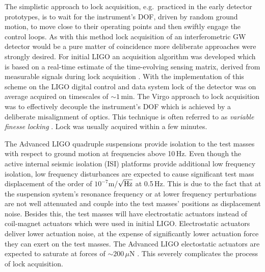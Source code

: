 The simplistic approach to lock acquisition, e.g.\ practiced in the early detector prototypes, is to wait for the instrument's DOF, driven by random ground motion, to move close to their operating points and then swiftly engage
the control loops. As with this method lock acquisition of an interferometric GW detector would be a pure matter of coincidence more deliberate approaches were strongly desired.
For initial LIGO an acquisition algorithm was developed which is based on a real-time estimate of the time-evolving sensing matrix, derived from measurable signals during lock acquisition \cite{EMFBBGKLSW02}.
With the implementation of this scheme on the LIGO digital control and data system lock of the detector was on average acquired on timescales of $\sim1$\,min. 
The Virgo approach to lock acquisition was to effectively decouple the instrument's DOF which is achieved by a deliberate misalignment of optics. This technique is often referred to as \emph{variable 
finesse locking} \cite{Virgo_VariableFinesse06}. Lock was usually acquired within a few minutes. 

The Advanced LIGO quadruple suspensions provide isolation to the test masses with respect to ground motion at frequencies above 10\,Hz.
Even though the active internal seismic isolation (ISI) platforms provide additional low frequency isolation, low frequency disturbances are
expected to cause significant test mass displacement of the order of $10^{-7}$m/$\sqrt{\textnormal{Hz}}$ at 0.5\,Hz. This is due to the fact that at 
the suspension system's resonance frequency or at lower frequency perturbations are not well attenuated and couple into the test masses' positions as displacement noise.
Besides this, the test masses will have electrostatic actuators instead of coil-magnet actuators which were used in initial LIGO. Electrostatic actuators deliver
lower actuation noise, at the expense of significantly lower actuation force they can exert on the test masses. The Advanced LIGO electostatic actuators are expected to
saturate at forces of $\sim200\,\mu$N \cite{LIGO_T1000294}. This severely complicates the process of lock acquisition.

